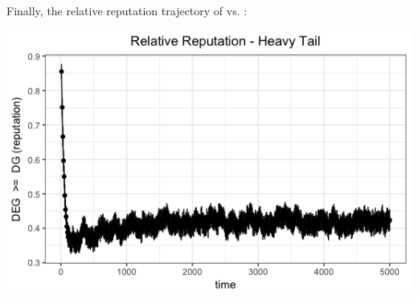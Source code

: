 \documentclass[../competing_bandits_with_appendix.tex]{subfiles}
\begin{document}
Finally, the relative reputation trajectory of \DEG vs. \DG:
\begin{center}
\includegraphics[scale=0.35]{ec19paper/appendix_figures/rel_rep_ht_3_arms}
\end{center}
\end{document}
